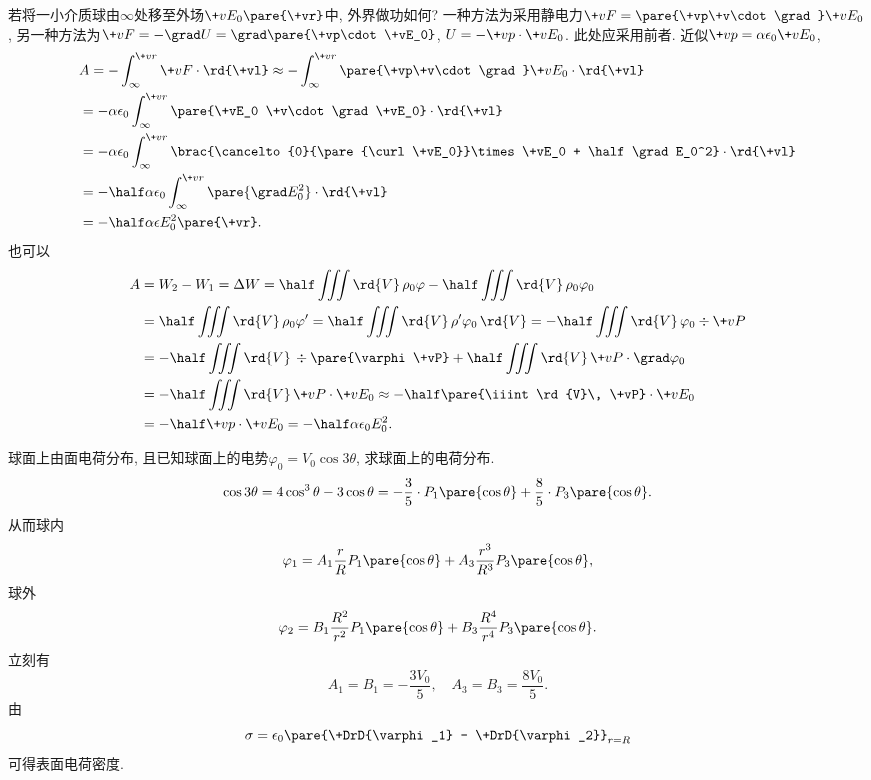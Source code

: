 \documentclass[hidelinks]{ctexart}
\begin{document}
\begin{sample}
    \begin{ex}
        若将一小介质球由$\infty$处移至外场$\+vE_0\pare{\+vr}$中, 外界做功如何? 一种方法为采用静电力$\+vF = \pare{\+vp\+v\cdot \grad}\+vE_0$, 另一种方法为$\+vF = -\grad U = \grad\pare{\+vp\cdot \+vE_0}$, $U = -\+vp\cdot \+vE_0$. 此处应采用前者. 近似$\+vp = \alpha \epsilon_0 \+vE_0$,
        \begin{align*}
            & A = -\int_\infty^{\+vr}\+vF\cdot \rd{\+vl} \approx -\int_\infty^{\+vr} \pare{\+vp\+v\cdot\grad} \+vE_0 \cdot \rd{\+vl} \\
            & = -\alpha \epsilon_0\int_\infty^{\+vr} \pare{\+vE_0 \+v\cdot \grad \+vE_0}\cdot \rd{\+vl} \\
            & = -\alpha \epsilon_0\int_\infty^{\+vr} \brac{\cancelto{0}{\pare{\curl \+vE_0}}\times \+vE_0 + \half \grad E_0^2}\cdot \rd{\+vl} \\
            &= -\half \alpha \epsilon_0 \int_{\infty}^{\+vr}\pare{\grad E_0^2}\cdot \rd{\+vl} \\
            &= -\half \alpha \epsilon E_0^2\pare{\+vr}.
        \end{align*}
        也可以
        \begin{align*}
            A &= W_2 - W_1 = \Delta W = \half \iiint\rd{V}\,\rho_0\varphi - \half \iiint\rd{V}\,\rho_0 \varphi_0 \\
            &= \half \iiint \rd{V}\,\rho_0 \varphi' = \half \iiint \rd{V}\, \rho'\varphi_0\,\rd{V} = -\half \iiint \rd{V}\,\varphi_0 \div \+vP \\
            &= -\half \iiint \rd{V}\,\div\pare{\varphi \+vP} + \half \iiint\rd{V}\,\+vP\cdot \grad\varphi_0\\
            &= -\half \iiint \rd{V}\,\+vP\cdot \+vE_0 \approx -\half \pare{\iiint \rd{V}\, \+vP}\cdot \+vE_0 \\
            &= -\half \+vp\cdot \+vE_0 = -\half \alpha \epsilon_0 E_0^2.
        \end{align*}
    \end{ex}
\end{sample}
\begin{sample}
    \begin{ex}
        球面上由面电荷分布, 且已知球面上的电势$\varphi_0 = V_0 \cos 3\theta$, 求球面上的电荷分布.
        \[ \cos 3\theta = 4\cos^3\theta - 3\cos\theta = -\frac{3}{5}\cdot P_1\pare{\cos\theta} + \frac{8}{5}\cdot P_3\pare{\cos\theta}. \]
        从而球内
        \[ \varphi_1 = A_1 \frac{r}{R}P_1\pare{\cos\theta} + A_3 \frac{r^3}{R^3}P_3\pare{\cos\theta}, \]
        球外
        \[ \varphi_2 = B_1 \frac{R^2}{r^2}P_1\pare{\cos\theta} + B_3 \frac{R^4}{r^4}P_3\pare{\cos\theta}. \]
        立刻有
        \[ A_1 = B_1 = -\frac{3V_0}{5},\quad A_3 = B_3 = \frac{8V_0}{5}. \]
        由
        \[ \sigma = \epsilon_0 \pare{\+DrD{\varphi_1} - \+DrD{\varphi_2}}_{r=R} \]
        可得表面电荷密度.
    \end{ex}
\end{sample}
\end{document}

